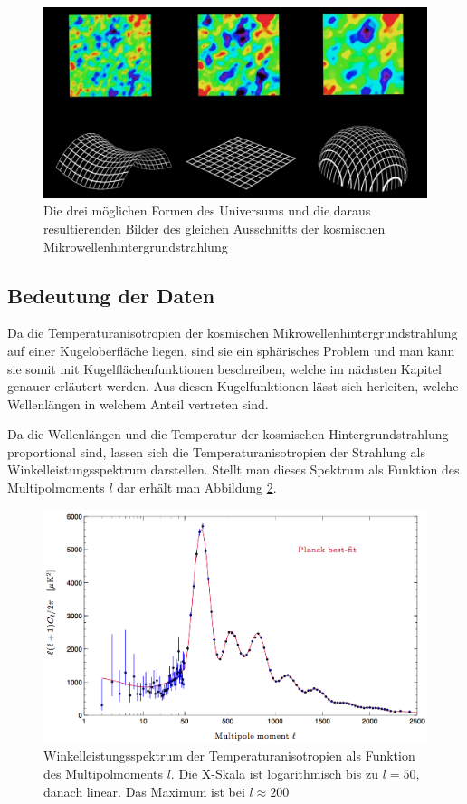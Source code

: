 \begin{figure}
	\includegraphics[width=\linewidth]{cmb/images/universe_shapes.jpg}
	\caption{Die drei möglichen Formen des Universums und die daraus 
		resultierenden Bilder des gleichen Ausschnitts der kosmischen
		Mikrowellenhintergrundstrahlung}
	\label{fig:universe_shapes}
\end{figure}

\subsection{Bedeutung der Daten\label{subsec:cmb:data-meaning}}
Da die Temperaturanisotropien der kosmischen Mikrowellenhintergrundstrahlung auf einer
Kugeloberfläche liegen, sind sie ein sphärisches Problem und man kann sie somit mit 
Kugelflächenfunktionen beschreiben, welche im nächsten Kapitel genauer erläutert werden.
Aus diesen Kugelfunktionen lässt sich herleiten, welche Wellenlängen in welchem Anteil vertreten sind.

Da die Wellenlängen und die Temperatur der kosmischen Hintergrundstrahlung proportional sind, lassen sich die Temperaturanisotropien der Strahlung als Winkelleistungsspektrum darstellen.
Stellt man dieses Spektrum als Funktion des Multipolmoments $l$ dar erhält man 
Abbildung \ref{fig:planck_spectrum}.

\begin{figure}
	\includegraphics[width=\linewidth]{cmb/images/mission_spectrum.png}
	\caption{Winkelleistungsspektrum der Temperaturanisotropien als Funktion 
	des Multipolmoments $l$.
	Die X-Skala ist logarithmisch bis zu $l = 50$, danach linear. Das Maximum 
	ist bei $l \approx 200$}
	\label{fig:planck_spectrum}
\end{figure}

